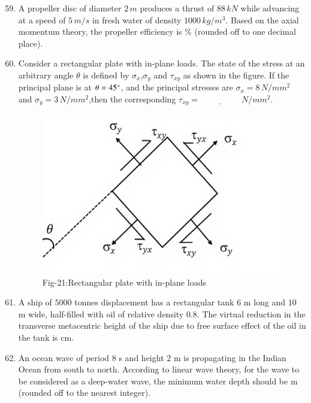 \documentclass[journal]{IEEEtran}
\theoremstyle{remark}
\begin{document}
\begin{enumerate}[itemsep=1em]
\setcounter{enumi}{58}
\item A propeller disc of diameter $2\,m$ produces a thrust of $88 \,kN$ while advancing at a speed of $5\,m/s$ in fresh water of density $1000\,kg/m^3$. Based on the axial momentum theory, the propeller efficiency is \underline{\hspace{2cm}} \% (rounded off to one decimal place). 
\end{enumerate}

\begin{enumerate}[itemsep=1em]
\setcounter{enumi}{59}
\item Consider a rectangular plate with in-plane loads. The state of the stress at an arbitrary angle $\theta$ is defined by $\sigma_x$,$\sigma_y$ and $\tau_{xy}$ as shown in the figure. If the principal plane is at $\theta=45\degree$, and the principal stresses are $\sigma_x = 8\,N/mm^2$ and $\sigma_y=3 \,N/mm^2$,then the corresponding $\tau_{xy}=\underline{\hspace{2cm}}\,N/mm^2$.
\begin{figure}[H]
    \centering
    \includegraphics[width=0.4\columnwidth]{figs/fig-21.png}
    \caption*{Fig-21:Rectangular plate with in-plane loads}
    \label{fig-21}
\end{figure}

\end{enumerate}

\begin{enumerate}[itemsep=1em]
\setcounter{enumi}{60}
\item A ship of $5000$ tonnes displacement has a rectangular tank $6$ m long and $10$ m wide, half-filled with oil of relative density $0.8$. The virtual reduction in the transverse 
metacentric height of the ship due to free surface effect of the oil in the tank is \underline{\hspace{2cm}} cm.  
\end{enumerate}

\newpage
\vspace*{0.25cm}

\begin{enumerate}[itemsep=1em]
\setcounter{enumi}{61}
\item An ocean wave of period $8$ s and height $2$ m is propagating in the Indian Ocean from south to north. According to linear wave theory, for the wave to be considered as a 
deep-water wave, the minimum water depth should be \underline{\hspace{1cm}} m (rounded off to the nearest integer). 
    
\end{enumerate}
\end{document}
